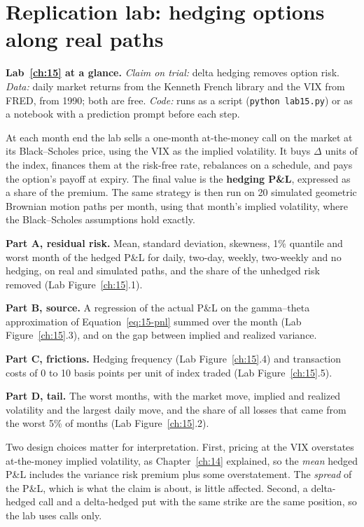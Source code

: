 \section{Replication lab: hedging options along real paths}
\label{sec:15-lab}

\begin{callout}
\textbf{Lab~\ref{ch:15} at a glance.} \emph{Claim on trial:} delta hedging removes option risk. \emph{Data:} daily market returns from the Kenneth French library and the VIX from FRED, from 1990; both are free. \emph{Code:} runs as a script (\texttt{python lab15.py}) or as a notebook with a prediction prompt before each step.
\end{callout}

At each month end the lab sells a one-month at-the-money call on the market at its Black--Scholes price, using the VIX as the implied volatility. It buys $\Delta$ units of the index, finances them at the risk-free rate, rebalances on a schedule, and pays the option's payoff at expiry. The final value is the \textbf{hedging P\&L}, expressed as a share of the premium. The same strategy is then run on 20 simulated geometric Brownian motion paths per month, using that month's implied volatility, where the Black--Scholes assumptions hold exactly.

\textbf{Part A, residual risk.} Mean, standard deviation, skewness, 1\% quantile and worst month of the hedged P\&L for daily, two-day, weekly, two-weekly and no hedging, on real and simulated paths, and the share of the unhedged risk removed (Lab Figure~\ref{ch:15}.1).

\textbf{Part B, source.} A regression of the actual P\&L on the gamma--theta approximation of Equation~\eqref{eq:15-pnl} summed over the month (Lab Figure~\ref{ch:15}.3), and on the gap between implied and realized variance.

\textbf{Part C, frictions.} Hedging frequency (Lab Figure~\ref{ch:15}.4) and transaction costs of 0 to 10 basis points per unit of index traded (Lab Figure~\ref{ch:15}.5).

\textbf{Part D, tail.} The worst months, with the market move, implied and realized volatility and the largest daily move, and the share of all losses that came from the worst 5\% of months (Lab Figure~\ref{ch:15}.2).

Two design choices matter for interpretation. First, pricing at the VIX overstates at-the-money implied volatility, as Chapter~\ref{ch:14} explained, so the \emph{mean} hedged P\&L includes the variance risk premium plus some overstatement. The \emph{spread} of the P\&L, which is what the claim is about, is little affected. Second, a delta-hedged call and a delta-hedged put with the same strike are the same position, so the lab uses calls only.

